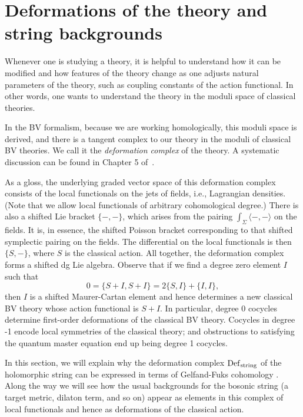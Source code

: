 \section{Deformations of the theory and string backgrounds}
\label{sec: moduli}


Whenever one is studying a theory,
it is helpful to understand how it can be modified 
and how features of the theory change as one adjusts natural parameters of the theory,
such as coupling constants of the action functional.
In other words, one wants to understand the theory in the moduli space of classical theories.

In the BV formalism, because we are working homologically, this moduli space is derived,
and there is a tangent complex to our theory in the moduli of classical BV theories.
We call it the {\em deformation complex} of the theory.
A systematic discussion can be found in Chapter 5 of~\cite{CosBook}.

As a gloss, the underlying graded vector space of this deformation complex consists of the local functionals on the jets of fields, i.e., Lagrangian densities.
(Note that we allow local functionals of arbitrary cohomological degree.) 
There is also a shifted Lie bracket $\{-,-\}$, 
which arises from the pairing $\int_\Sigma \langle-,-\rangle$ on the fields.
It is, in essence, the shifted Poisson bracket corresponding to that shifted symplectic pairing on the fields.
The differential on the local functionals is then $\{S,-\}$, where $S$ is the classical action. 
All together, the deformation complex forms a shifted dg Lie algebra. 
Observe that if we find a degree zero element $I$ such that
\[
0=\{S +I,S +I\}=2\{S,I\}+\{I,I\},
\]
then $I$ is a shifted Maurer-Cartan element and 
hence determines a new classical BV theory whose action functional is $S + I$. 
In particular, degree 0 cocycles determine first-order deformations of the classical BV theory. Cocycles in degree -1 encode local symmetries of the classical theory; 
and obstructions to satisfying the quantum master equation end up being degree 1 cocycles.

In this section, we will explain why the deformation complex ${\rm Def}_{\rm string}$ of the holomorphic string 
can be expressed in terms of Gelfand-Fuks cohomology \cite{Fuks}. 
Along the way we will see how the usual backgrounds for the bosonic string (a target metric, dilaton term, and so on) appear as elements in this complex of local functionals and hence as deformations of the classical action. 

